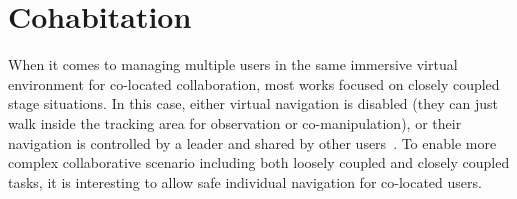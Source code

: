 \section{Cohabitation}

When it comes to managing multiple users in the same immersive virtual environment for co-located collaboration, most works focused on closely coupled stage situations. In this case, either virtual navigation is disabled (they can just walk inside the tracking area for observation or co-manipulation), or their navigation is controlled by a leader and shared by other users~\citep{Beck2013GGT, Kulik2011CSS}. To enable more complex collaborative scenario including both loosely coupled and closely coupled tasks, it is interesting to allow safe individual navigation for co-located users.